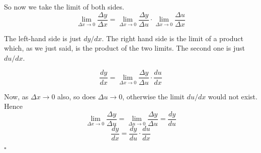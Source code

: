 \documentclass[11pt, oneside]{article}
\begin{document}
So now we take the limit of both sides. 
\[ \lim_{\Delta x \rightarrow 0} \frac{\Delta y}{\Delta x} = \lim_{\Delta x \rightarrow 0} \frac{\Delta y}{\Delta u} \cdot \lim_{\Delta x \rightarrow 0} \frac{\Delta u}{\Delta x} \]

The left-hand side is just $dy/dx$.  The right hand side is the limit of a product which, as we just said, is the product of the two limits.  The second one is just $du/dx$.

\[ \frac{dy}{dx} = \lim_{\Delta x \rightarrow 0} \frac{\Delta y}{\Delta u} \cdot \frac{du}{dx} \]

Now, as $\Delta x \rightarrow 0$ also, so does $\Delta u \rightarrow 0$, otherwise the limit $du/dx$ would not exist.  Hence
\[ \lim_{\Delta x \rightarrow 0} \frac{\Delta y}{\Delta u} = \lim_{\Delta u \rightarrow 0} \frac{\Delta y}{\Delta u} = \frac{dy}{du} \]
\[ \frac{dy}{dx} =  \frac{dy}{du} \cdot \frac{du}{dx} \]

$\square$
\end{document}

